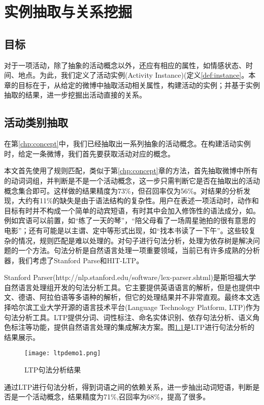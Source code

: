 \chapter{实例抽取与关系挖掘}
\section{目标}
对于一项活动，除了抽象的活动概念以外，还应有相应的属性，如情感状态、时间、地点。为此，我们定义了活动实例(Activity Instance)(定义\ref{def:instance}。本章的目标在于，从给定的微博中抽取活动相关属性，构建活动的实例；并基于实例抽取的结果，进一步挖掘出活动直接的关系。

\section{活动类别抽取}
在第\ref{chp:concept}中，我们已经抽取出一系列抽象的活动概念。在构建活动实例时，给定一条微博，我们首先要获取活动对应的概念。

本文首先使用了规则匹配，类似于第\ref{chp:concept}章的方法，首先抽取微博中所有的动词词组，并判断是不是一个活动概念，这一步只需判断它是否在抽取出的活动概念集合即可。这样做的结果精度为73\%，但召回率仅为56\%。对结果的分析发现，大约有11\%的缺失是由于语法结构的复杂性。用户在表述一项活动时，动作和目标有时并不构成一个简单的动宾短语，有时其中会加入修饰性的语法成分，如。例如宾语可以前置，如``练了一天的琴''，``陪父母看了一场周星驰拍的很有意思的电影''；还有可能是以主谓、定中等形式出现，如``找本书读了一下午''。这些较复杂的情况，规则匹配是难以处理的。对句子进行句法分析，处理为依存树是解决问题的一个方法。句法分析是自然语言处理一项重要领域，当前已有许多成熟的分析器，我们考虑了Stanford Parse和HIT-LTP。

Stanford Parser(http://nlp.stanford.edu/software/lex-parser.shtml)是斯坦福大学自然语言处理组开发的句法分析工具。它主要提供英语语言的解析，但是也提供中文、德语、阿拉伯语等多语种的解析，但它的处理结果并不非常直观。最终本文选择哈尔滨工业大学开源的语言技术平台(Language Technology Platform, LTP)\cite{che2010ltp}作为句法分析工具。LTP提供分词、词性标注、命名实体识别、依存句法分析、语义角色标注等功能，提供自然语言处理的集成解决方案。图\ref{fig:ltp_demo}是LTP进行句法分析的结果展示。

\begin{figure}[!h]
\centering
\texttt{[image: ltpdemo1.png]}
\caption{LTP句法分析结果}
\label{fig:ltp_demo}
\end{figure}

通过LTP进行句法分析，得到词语之间的依赖关系，进一步抽出动词短语，判断是否是一个活动概念，结果精度为71\%,召回率为68\%，提高了很多。


